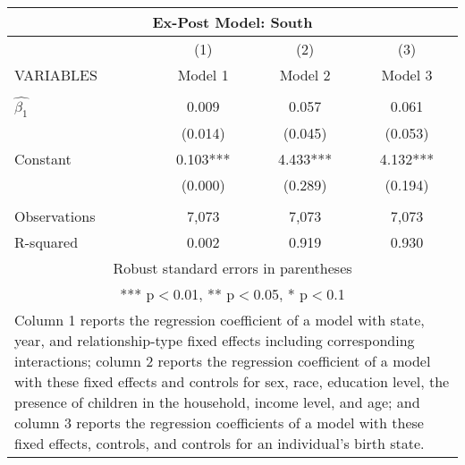 \begin{tabular}{lccc}
\multicolumn{4}{c}{Ex-Post Model: South} \\ \hline
 & (1) & (2) & (3) \\
VARIABLES & Model 1 & Model 2 & Model 3 \\ \hline
 &  &  &  \\
$\hat{\beta_1}$ & 0.009 & 0.057 & 0.061 \\
 & (0.014) & (0.045) & (0.053) \\
Constant & 0.103*** & 4.433*** & 4.132*** \\
 & (0.000) & (0.289) & (0.194) \\
 &  &  &  \\
Observations & 7,073 & 7,073 & 7,073 \\
 R-squared & 0.002 & 0.919 & 0.930 \\ \hline
\multicolumn{4}{c}{ Robust standard errors in parentheses} \\
\multicolumn{4}{c}{ *** p$<$0.01, ** p$<$0.05, * p$<$0.1} \\
\multicolumn{4}{p{0.8\linewidth}}{\small Column 1 reports the regression coefficient of a model with state, year, and relationship-type fixed effects including corresponding interactions; column 2 reports the regression coefficient of a model with these fixed effects and controls for sex, race, education level, the presence of children in the household, income level, and age; and column 3 reports the regression coefficients of a model with these fixed effects, controls, and controls for an individual’s birth state.} \\
\end{tabular}
